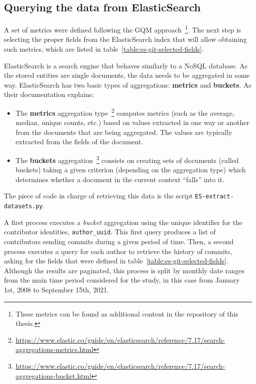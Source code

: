 \documentclass[a4paper, 12pt]{book}
\begin{document}
\subsection{Querying the data from ElasticSearch}
\label{ssec:querying-es}

A set of metrics were defined following the GQM approach~\footnote{These metrics can be found as additional content in the repository of this thesis.}. The next step is selecting the proper fields from the ElasticSearch index that will allow obtaining such metrics, which are listed in table~\ref{table:es-git-selected-fields}.

ElasticSearch is a search engine that behaves similarly to a NoSQL database. As the stored entities are single documents, the data needs to be aggregated in some way. ElasticSearch has two basic types of aggregations: \textbf{metrics} and \textbf{buckets}. As their documentation explains:
\begin{itemize}
\item The \textbf{metrics} aggregation type~\footnote{\url{https://www.elastic.co/guide/en/elasticsearch/reference/7.17/search-aggregations-metrics.html}} computes metrics (such as the average, median, unique counts, etc.) based on values extracted in one way or another from the documents that are being aggregated. The values are typically extracted from the fields of the document.
\item The \textbf{buckets} aggregation~\footnote{\url{https://www.elastic.co/guide/en/elasticsearch/reference/7.17/search-aggregations-bucket.html}} consists on creating sets of documents (called buckets) taking a given criterion (depending on the aggregation type) which determines whether a document in the current context ``falls'' into it.
\end{itemize} 

The piece of code in charge of retrieving this data is the script \texttt{ES-extract-datasets.py}.

A first process executes a \textit{bucket} aggregation using the unique identifier for the contributor identities, \texttt{author\_uuid}. This first query produces a list of contributors sending commits during a given period of time. Then, a second process executes a query for each author to retrieve the history of commits, asking for the fields that were defined in table~\ref{table:es-git-selected-fields}. Although the results are paginated, this process is split by monthly date ranges from the main time period considered for the study, in this case from January 1st, 2008 to September 15th, 2021.
\end{document}
